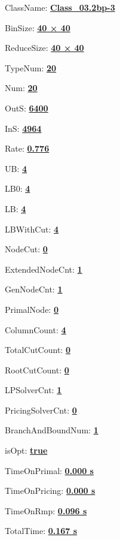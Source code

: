 \documentclass[11pt]{article}
\begin{document}
\pagestyle{empty}


ClassName: \underline{\textbf{Class_03.2bp-3}}
\par
BinSize: \underline{\textbf{40 × 40}}
\par
ReduceSize: \underline{\textbf{40 × 40}}
\par
TypeNum: \underline{\textbf{20}}
\par
Num: \underline{\textbf{20}}
\par
OutS: \underline{\textbf{6400}}
\par
InS: \underline{\textbf{4964}}
\par
Rate: \underline{\textbf{0.776}}
\par
UB: \underline{\textbf{4}}
\par
LB0: \underline{\textbf{4}}
\par
LB: \underline{\textbf{4}}
\par
LBWithCut: \underline{\textbf{4}}
\par
NodeCut: \underline{\textbf{0}}
\par
ExtendedNodeCnt: \underline{\textbf{1}}
\par
GenNodeCnt: \underline{\textbf{1}}
\par
PrimalNode: \underline{\textbf{0}}
\par
ColumnCount: \underline{\textbf{4}}
\par
TotalCutCount: \underline{\textbf{0}}
\par
RootCutCount: \underline{\textbf{0}}
\par
LPSolverCnt: \underline{\textbf{1}}
\par
PricingSolverCnt: \underline{\textbf{0}}
\par
BranchAndBoundNum: \underline{\textbf{1}}
\par
isOpt: \underline{\textbf{true}}
\par
TimeOnPrimal: \underline{\textbf{0.000 s}}
\par
TimeOnPricing: \underline{\textbf{0.000 s}}
\par
TimeOnRmp: \underline{\textbf{0.096 s}}
\par
TotalTime: \underline{\textbf{0.167 s}}
\par
\newpage


\end{document}
